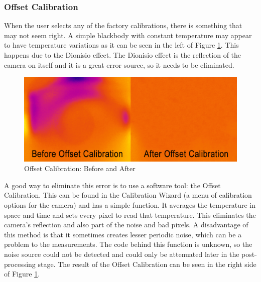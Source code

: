\subsubsection{Offset Calibration}
\par When the user selects any of the factory calibrations, there is something that may not seem right. A simple blackbody with constant temperature may appear to have temperature variations as it can be seen in the left of Figure \ref{fig:xeneth5}. This happens due to the Dionisio effect. The Dionisio effect is the reflection of the camera on itself and it is a great error source, so it needs to be eliminated. \\
\begin{figure}[h]
\centering
\includegraphics[width=0.7\linewidth]{Figures/3.Chapter/xeneth5.png}
\caption{Offset Calibration: Before and After}
\label{fig:xeneth5}
\end{figure}
\par A good way to eliminate this error is to use a software tool: the Offset Calibration. This can be found in the Calibration Wizard (a menu of calibration options for the camera) and has a simple function. It averages the temperature in space and time and sets every pixel to read that temperature. This eliminates the camera's reflection and also part of the noise and bad pixels. A disadvantage of this method is that it sometimes creates lesser periodic noise, which can be a problem to the measurements. The code behind this function is unknown, so the noise source could not be detected and could only be attenuated later in the post-processing stage. The result of the Offset Calibration can be seen in the right side of Figure \ref{fig:xeneth5}. \\